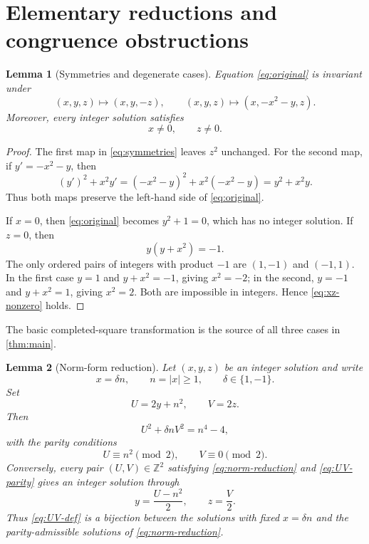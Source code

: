\documentclass[a4paper,11pt]{amsart}
\newtheorem{lemma}[lemma]{Lemma}
\theoremstyle{definition}
\theoremstyle{remark}
\newcommand{\Z}{\mathbb Z}
\begin{document}
\section{Elementary reductions and congruence obstructions}

\begin{lemma}[Symmetries and degenerate cases]\label{lem:symmetries}
Equation \eqref{eq:original} is invariant under
\begin{equation}\label{eq:symmetries}
(x,y,z)\longmapsto(x,y,-z),
\qquad
(x,y,z)\longmapsto(x,-x^2-y,z).
\end{equation}
Moreover, every integer solution satisfies
\begin{equation}\label{eq:xz-nonzero}
x\ne0,
\qquad z\ne0.
\end{equation}
\end{lemma}

\begin{proof}
The first map in \eqref{eq:symmetries} leaves $z^2$ unchanged.  For the second map, if $y'=-x^2-y$, then
\[
(y')^2+x^2y'
 =(-x^2-y)^2+x^2(-x^2-y)
 =y^2+x^2y.
\]
Thus both maps preserve the left-hand side of \eqref{eq:original}.

If $x=0$, then \eqref{eq:original} becomes $y^2+1=0$, which has no integer solution.  If $z=0$, then
\[
y(y+x^2)=-1.
\]
The only ordered pairs of integers with product $-1$ are $(1,-1)$ and $(-1,1)$.  In the first case $y=1$ and $y+x^2=-1$, giving $x^2=-2$; in the second, $y=-1$ and $y+x^2=1$, giving $x^2=2$.  Both are impossible in integers.  Hence \eqref{eq:xz-nonzero} holds.
\end{proof}

The basic completed-square transformation is the source of all three cases in \cref{thm:main}.

\begin{lemma}[Norm-form reduction]\label{lem:norm-reduction}
Let $(x,y,z)$ be an integer solution and write
\[
x=\delta n,
\qquad n=|x|\ge1,
\qquad \delta\in\{1,-1\}.
\]
Set
\begin{equation}\label{eq:UV-def}
U=2y+n^2,
\qquad V=2z.
\end{equation}
Then
\begin{equation}\label{eq:norm-reduction}
U^2+\delta nV^2=n^4-4,
\end{equation}
with the parity conditions
\begin{equation}\label{eq:UV-parity}
U\equiv n^2\pmod2,
\qquad V\equiv0\pmod2.
\end{equation}
Conversely, every pair $(U,V)\in\Z^2$ satisfying \eqref{eq:norm-reduction} and \eqref{eq:UV-parity} gives an integer solution through
\begin{equation}\label{eq:UV-inverse}
y=\frac{U-n^2}{2},
\qquad z=\frac V2.
\end{equation}
Thus \eqref{eq:UV-def} is a bijection between the solutions with fixed $x=\delta n$ and the parity-admissible solutions of \eqref{eq:norm-reduction}.
\end{lemma}
\end{document}
